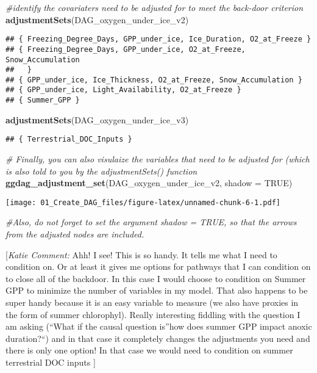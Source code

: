 \documentclass[
]{article}
\newenvironment{Shaded}{\begin{snugshade}}{\end{snugshade}}
\newcommand{\AttributeTok}[1]{\textcolor[rgb]{0.13,0.29,0.53}{#1}}
\newcommand{\CommentTok}[1]{\textcolor[rgb]{0.56,0.35,0.01}{\textit{#1}}}
\newcommand{\ConstantTok}[1]{\textcolor[rgb]{0.56,0.35,0.01}{#1}}
\newcommand{\FunctionTok}[1]{\textcolor[rgb]{0.13,0.29,0.53}{\textbf{#1}}}
\newcommand{\NormalTok}[1]{#1}
\begin{document}
\begin{Shaded}
\begin{Highlighting}[]
\CommentTok{\#identify the covariaters need to be adjusted for to meet the back{-}door criterion}
\FunctionTok{adjustmentSets}\NormalTok{(DAG\_oxygen\_under\_ice\_v2)}
\end{Highlighting}
\end{Shaded}

\begin{verbatim}
## { Freezing_Degree_Days, GPP_under_ice, Ice_Duration, O2_at_Freeze }
## { Freezing_Degree_Days, GPP_under_ice, O2_at_Freeze, Snow_Accumulation
##   }
## { GPP_under_ice, Ice_Thickness, O2_at_Freeze, Snow_Accumulation }
## { GPP_under_ice, Light_Availability, O2_at_Freeze }
## { Summer_GPP }
\end{verbatim}

\begin{Shaded}
\begin{Highlighting}[]
\FunctionTok{adjustmentSets}\NormalTok{(DAG\_oxygen\_under\_ice\_v3)}
\end{Highlighting}
\end{Shaded}

\begin{verbatim}
## { Terrestrial_DOC_Inputs }
\end{verbatim}

\begin{Shaded}
\begin{Highlighting}[]
\CommentTok{\# Finally, you can also visulaize the variables that need to be adjusted for (which is also told to you by the adjustmentSets() function }
\FunctionTok{ggdag\_adjustment\_set}\NormalTok{(DAG\_oxygen\_under\_ice\_v2, }\AttributeTok{shadow =} \ConstantTok{TRUE}\NormalTok{) }
\end{Highlighting}
\end{Shaded}

\texttt{[image: 01\_Create\_DAG\_files/figure-latex/unnamed-chunk-6-1.pdf]}

\begin{Shaded}
\begin{Highlighting}[]
\CommentTok{\#Also, do not forget to set the argument shadow = TRUE, so that the arrows from the adjusted nodes are included.}
\end{Highlighting}
\end{Shaded}

{ {[}\emph{Katie Comment:} Ahh! I see! This is so handy. It tells me
what I need to condition on. Or at least it gives me options for
pathways that I can condition on to close all of the backdoor. In this
case I would choose to condition on Summer GPP to minimize the number of
variables in my model. That also happens to be super handy because it is
an easy variable to measure (we also have proxies in the form of summer
chlorophyl). Really interesting fiddling with the question I am asking
(``What if the causal question is''how does summer GPP impact anoxic
duration?{}``) and in that case it completely changes the adjustments
you need and there is only one option! In that case we would need to
condition on summer terrestrial DOC inputs {]} }
\end{document}
